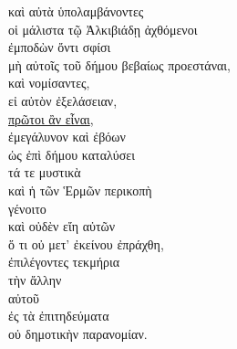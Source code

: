 
{\large
\begin{greek}
\noindent καὶ αὐτὰ ὑπολαμβάνοντες \\
οἱ μάλιστα τῷ Ἀλκιβιάδῃ ἀχθόμενοι \\
\tabto{2em} ἐμποδὼν ὄντι σφίσι \\
\tabto{4em} μὴ αὐτοῖς τοῦ δήμου βεβαίως προεστάναι, \\
καὶ νομίσαντες, \\
\tabto{2em} εἰ αὐτὸν ἐξελάσειαν, \\
\underline{πρῶτοι ἂν εἶναι}, \\
ἐμεγάλυνον καὶ ἐβόων \\
\tabto{2em} ὡς ἐπὶ δήμου καταλύσει \\
\tabto{4em} τά τε μυστικὰ \\
\tabto{4em} καὶ ἡ τῶν Ἑρμῶν περικοπὴ \\
\tabto{2em} γένοιτο \\
\tabto{2em} καὶ οὐδὲν εἴη αὐτῶν \\
\tabto{4em} ὅ τι οὐ μετ' ἐκείνου ἐπράχθη, \\
ἐπιλέγοντες τεκμήρια \\
\tabto{2em} τὴν ἄλλην \\
\tabto{4em} αὐτοῦ \\
\tabto{4em} ἐς τὰ ἐπιτηδεύματα \\
\tabto{2em} οὐ δημοτικὴν παρανομίαν.\\

\end{greek}
}

